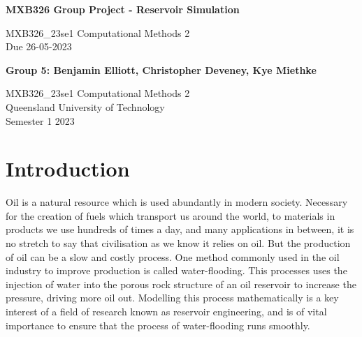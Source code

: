 \documentclass[11pt]{article}
\begin{document}

\begin{titlepage}
   \begin{center}
       \vspace*{6cm}

       \begin{large}\textbf{MXB326 Group Project - Reservoir Simulation}\end{large}

       \vspace{0.5cm}
        MXB326\_23se1 Computational Methods 2\\
        Due 26-05-2023
            
       \vspace{1.5cm}

       \textbf{Group 5: Benjamin Elliott, Christopher Deveney, Kye Miethke}

       \vfill
            
       MXB326\_23se1 Computational Methods 2\\
       Queensland University of Technology\\
       Semester 1 2023
            
   \end{center}
\end{titlepage}
\newpage


\tableofcontents
\newpage
{}


\section{Introduction}
Oil is a natural resource which is used abundantly in modern society. Necessary for the creation of fuels which transport us around the world, to materials in products we use hundreds of times a day, and many applications in between, it is no stretch to say that civilisation as we know it relies on oil. But the production of oil can be a slow and costly process. One method commonly used in the oil industry to improve production is called water-flooding. This processes uses the injection of water into the porous rock structure of an oil reservoir to increase the pressure, driving more oil out. Modelling this process mathematically is a key interest of a field of research known as reservoir engineering, and is of vital importance to ensure that the process of water-flooding runs smoothly.\\
\end{document}
